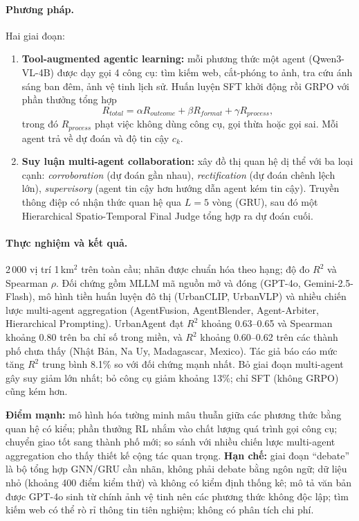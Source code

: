 \paragraph{Phương pháp.} Hai giai đoạn:
\begin{enumerate}
  \item \textbf{Tool-augmented agentic learning:} mỗi phương thức một agent (Qwen3-VL-4B) được dạy gọi 4 công cụ: tìm kiếm web, cắt-phóng to ảnh, tra cứu ánh sáng ban đêm, ảnh vệ tinh lịch sử. Huấn luyện SFT khởi động rồi GRPO với phần thưởng tổng hợp
  \begin{equation}
    R_{total} = \alpha R_{outcome} + \beta R_{format} + \gamma R_{process},
  \end{equation}
  trong đó $R_{process}$ phạt việc không dùng công cụ, gọi thừa hoặc gọi sai. Mỗi agent trả về dự đoán và độ tin cậy $c_k$.
  \item \textbf{Suy luận multi-agent collaboration:} xây đồ thị quan hệ dị thể với ba loại cạnh: \emph{corroboration} (dự đoán gần nhau), \emph{rectification} (dự đoán chênh lệch lớn), \emph{supervisory} (agent tin cậy hơn hướng dẫn agent kém tin cậy). Truyền thông điệp có nhận thức quan hệ qua $L=5$ vòng (GRU), sau đó một Hierarchical Spatio-Temporal Final Judge tổng hợp ra dự đoán cuối.
\end{enumerate}

\paragraph{Thực nghiệm và kết quả.} 2\,000 vị trí 1\,km$^2$ trên toàn cầu; nhãn được chuẩn hóa theo hạng; độ đo $R^2$ và Spearman $\rho$. Đối chứng gồm MLLM mã nguồn mở và đóng (GPT-4o, Gemini-2.5-Flash), mô hình tiền huấn luyện đô thị (UrbanCLIP, UrbanVLP) và nhiều chiến lược multi-agent aggregation (AgentFusion, AgentBlender, Agent-Arbiter, Hierarchical Prompting). UrbanAgent đạt $R^2$ khoảng 0.63--0.65 và Spearman khoảng 0.80 trên ba chỉ số trong miền, và $R^2$ khoảng 0.60--0.62 trên các thành phố chưa thấy (Nhật Bản, Na Uy, Madagascar, Mexico). Tác giả báo cáo mức tăng $R^2$ trung bình 8.1\% so với đối chứng mạnh nhất. Bỏ giai đoạn multi-agent gây suy giảm lớn nhất; bỏ công cụ giảm khoảng 13\%; chỉ SFT (không GRPO) cũng kém hơn.

\begin{nhanxet}
\textbf{Điểm mạnh:} mô hình hóa tường minh mâu thuẫn giữa các phương thức bằng quan hệ có kiểu; phần thưởng RL nhắm vào chất lượng quá trình gọi công cụ; chuyển giao tốt sang thành phố mới; so sánh với nhiều chiến lược multi-agent aggregation cho thấy thiết kế cộng tác quan trọng. \textbf{Hạn chế:} giai đoạn ``debate'' là bộ tổng hợp GNN/GRU cần nhãn, không phải debate bằng ngôn ngữ; dữ liệu nhỏ (khoảng 400 điểm kiểm thử) và không có kiểm định thống kê; mô tả văn bản được GPT-4o sinh từ chính ảnh vệ tinh nên các phương thức không độc lập; tìm kiếm web có thể rò rỉ thông tin tiên nghiệm; không có phân tích chi phí.
\end{nhanxet}

